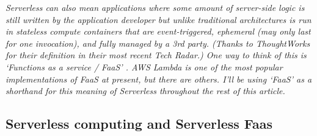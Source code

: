 \emph{Serverless can also mean applications where some amount of server-side logic is still written by the application developer but unlike traditional architectures is run in stateless compute containers that are event-triggered, ephemeral (may only last for one invocation), and fully managed by a 3rd party. (Thanks to ThoughtWorks for their definition in their most recent Tech Radar.) One way to think of this is ‘Functions as a service / FaaS’ . AWS Lambda is one of the most popular implementations of FaaS at present, but there are others. I’ll be using ‘FaaS’ as a shorthand for this meaning of Serverless throughout the rest of this article.\cite{MikeRoberts2016}}








\subsection{Serverless computing and Serverless Faas}


